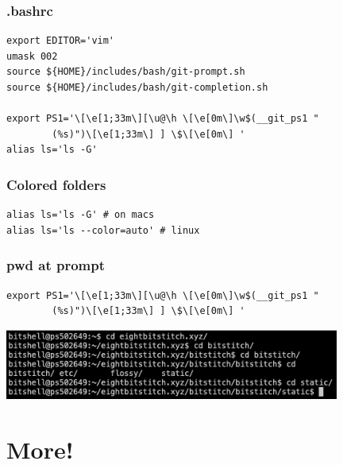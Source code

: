 \documentclass{beamer}
\begin{document}

\begin{frame}[fragile]
	\frametitle{.bashrc}
	\begin{verbatim}
export EDITOR='vim'
umask 002
source ${HOME}/includes/bash/git-prompt.sh
source ${HOME}/includes/bash/git-completion.sh

export PS1='\[\e[1;33m\][\u@\h \[\e[0m\]\w$(__git_ps1 " 
        (%s)")\[\e[1;33m\] ] \$\[\e[0m\] '
alias ls='ls -G'
	\end{verbatim}
\end{frame}

\begin{frame}[fragile]
	\frametitle{Colored folders}
	\pause
	\begin{verbatim}
alias ls='ls -G' # on macs
alias ls='ls --color=auto' # linux
	\end{verbatim}
\end{frame}

\begin{frame}[fragile]
	\frametitle{pwd at prompt}
	\begin{verbatim}
export PS1='\[\e[1;33m\][\u@\h \[\e[0m\]\w$(__git_ps1 " 
        (%s)")\[\e[1;33m\] ] \$\[\e[0m\] '
	\end{verbatim}
	\includegraphics[width=11cm]{pwd.png}
\end{frame}

\section{More!}
\end{document}
